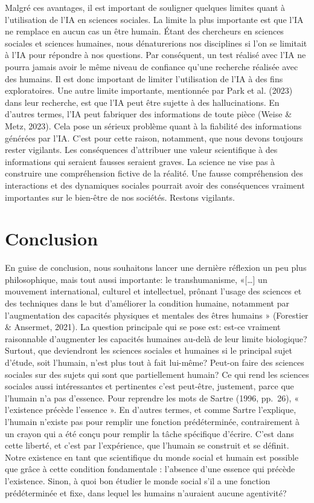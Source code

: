 \documentclass[
  letterpaper,
  DIV=11,
  numbers=noendperiod]{scrreprt}
\begin{document}
Malgré ces avantages, il est important de souligner quelques limites
quant à l'utilisation de l'IA en sciences sociales. La limite la plus
importante est que l'IA ne remplace en aucun cas un être humain. Étant
des chercheurs en sciences sociales et sciences humaines, nous
dénaturerions nos disciplines si l'on se limitait à l'IA pour répondre à
nos questions. Par conséquent, un test réalisé avec l'IA ne pourra
jamais avoir le même niveau de confiance qu'une recherche réalisée avec
des humains. Il est donc important de limiter l'utilisation de l'IA à
des fins exploratoires. Une autre limite importante, mentionnée par Park
et al. (2023) dans leur recherche, est que l'IA peut être sujette à des
hallucinations. En d'autres termes, l'IA peut fabriquer des informations
de toute pièce (Weise \& Metz, 2023). Cela pose un sérieux problème
quant à la fiabilité des informations générées par l'IA. C'est pour
cette raison, notamment, que nous devons toujours rester vigilants. Les
conséquences d'attribuer une valeur scientifique à des informations qui
seraient fausses seraient graves. La science ne vise pas à construire
une compréhension fictive de la réalité. Une fausse compréhension des
interactions et des dynamiques sociales pourrait avoir des conséquences
vraiment importantes sur le bien-être de nos sociétés. Restons
vigilants.

\section{Conclusion}\label{conclusion-6}

En guise de conclusion, nous souhaitons lancer une dernière réflexion un
peu plus philosophique, mais tout aussi importante: le transhumanisme,
«{[}\ldots{]} un mouvement international, culturel et intellectuel,
prônant l'usage des sciences et des techniques dans le but d'améliorer
la condition humaine, notamment par l'augmentation des capacités
physiques et mentales des êtres humains » (Forestier \& Ansermet, 2021).
La question principale qui se pose est: est-ce vraiment raisonnable
d'augmenter les capacités humaines au-delà de leur limite biologique?
Surtout, que deviendront les sciences sociales et humaines si le
principal sujet d'étude, soit l'humain, n'est plus tout à fait lui-même?
Peut-on faire des sciences sociales sur des sujets qui sont que
partiellement humain? Ce qui rend les sciences sociales aussi
intéressantes et pertinentes c'est peut-être, justement, parce que
l'humain n'a pas d'essence. Pour reprendre les mots de Sartre (1996,
pp.~26), « l'existence précède l'essence ». En d'autres termes, et comme
Sartre l'explique, l'humain n'existe pas pour remplir une fonction
prédéterminée, contrairement à un crayon qui a été conçu pour remplir la
tâche spécifique d'écrire. C'est dans cette liberté, et c'est par
l'expérience, que l'humain se construit et se définit. Notre existence
en tant que scientifique du monde social et humain est possible que
grâce à cette condition fondamentale : l'absence d'une essence qui
précède l'existence. Sinon, à quoi bon étudier le monde social s'il a
une fonction prédéterminée et fixe, dans lequel les humains n'auraient
aucune agentivité?
\end{document}

